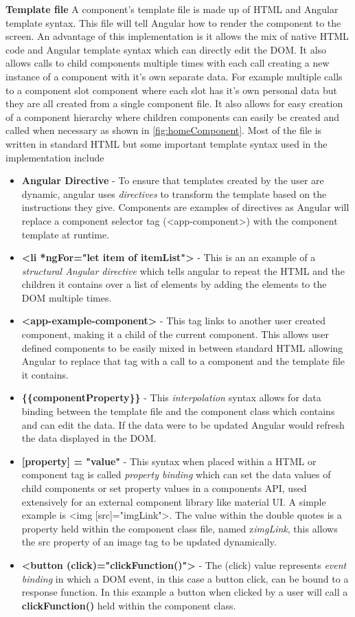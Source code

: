 \documentclass{l4proj}
\begin{document}
\textbf{Template file}
A component's template file is made up of HTML and Angular template syntax. This file will tell Angular how to render the component to the screen. An advantage of this implementation is it allows the mix of native HTML code and Angular template syntax which can directly edit the DOM. It also allows calls to child components multiple times with each call creating a new instance of a component with it's own separate data. For example multiple calls to a component slot component where each slot has it's own personal data but they are all created from a single component file. It also allows for easy creation of a component hierarchy where children components can easily be created and called when necessary as shown in \ref{fig:homeComponent}. Most of the file is written in standard HTML but some important template syntax used in the implementation include
\begin{itemize}
    \item \textbf{Angular Directive} - To ensure that templates created by the user are dynamic, angular uses \emph{directives} to transform the template based on the instructions they give. Components are examples of directives as Angular will replace a component selector tag (<app-component>) with the component template at runtime.
    \item \textbf{<li *ngFor="let item of itemList">} - This is an an example of a \emph{structural Angular directive} which tells angular to repeat the HTML and the children it contains over a list of elements by adding the elements to the DOM multiple times.
    \item \textbf{<app-example-component>} - This tag links to another user created component, making it a child of the current component. This allows user defined components to be easily mixed in between standard HTML allowing Angular to replace that tag with a call to a component and the template file it contains.
    \item \textbf{ \{\{componentProperty\}\}} - This \emph{interpolation} syntax allows for data binding between the template file and the component class which contains and can edit the data. If the data were to be updated Angular would refresh the data displayed in the DOM.
    \item \textbf{[property] = "value"} - This syntax when placed within a HTML or component tag is called \emph{property binding} which can set the data values of child components or set property values in a components API, used extensively for an external component library like material UI. A simple example is <img [src]="imgLink">. The value within the double quotes is a property held within the component class file, named z\emph{imgLink}, this allows the src property of an image tag to be updated dynamically.
    \item \textbf{<button (click)="clickFunction()">} - The (click) value represents \emph{event binding} in which a DOM event, in this case a button click, can be bound to a response function. In this example a button when clicked by a user will call a \textbf{clickFunction()} held within the component class.
\end{itemize}
\end{document}
